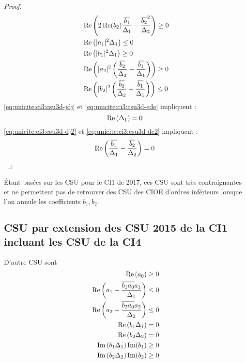 \begin{proof}
\begin{minipage}{0.49\textwidth}
\begin{align}
        \label{eq:unicite:ci3:csu3d-ere}&\Re\left(2\Re(b_2)\frac{\conj{b_1}}{\Delta_1}-\frac{\conj{b_2}^2}{\Delta_2}\right) \ge 0\\
        \label{eq:unicite:ci3:csu3d-jdj}&\Re\left(|a_1|^2\Delta_1\right) \le 0 \\
        \label{eq:unicite:ci3:csu3d-ede}&\Re\left(|b_1|^2\Delta_1\right) \ge 0 \\
        \label{eq:unicite:ci3:csu3d-dj2}&\Re\left(|a_2|^2\left(\frac{\conj{b_2}}{\Delta_2}-\frac{\conj{b_1}}{\Delta_1}\right)\right)\ge 0\\
        \label{eq:unicite:ci3:csu3d-de2}&\Re\left(|b_2|^2\left(\frac{\conj{b_2}}{\Delta_2}-\frac{\conj{b_1}}{\Delta_1}\right)\right)\le 0
      \end{align}
      \eqref{eq:unicite:ci3:csu3d-jdj} et \eqref{eq:unicite:ci3:csu3d-ede} impliquent :
      \begin{equation}
        \Re\left(\Delta_1\right) = 0\\\
      \end{equation}
      \eqref{eq:unicite:ci3:csu3d-dj2} et \eqref{eq:unicite:ci3:csu3d-de2} impliquent :
      \begin{equation}
        \Re\left(\frac{\conj{b_1}}{\Delta_1}-\frac{\conj{b_2}}{\Delta_2}\right) = 0\\\
      \end{equation}
    \end{minipage}
  \end{proof}

  Étant basées sur les CSU pour le CI1 de 2017, ces CSU sont très contraignantes et ne permettent pas de retrouver des CSU des CIOE d'ordres inférieurs lorsque l'on annule les coefficients \(b_1, b_2\). 


\subsection{CSU par extension des CSU 2015 de la CI1 incluant les CSU de la CI4}

  \begin{prop}
    D'autre CSU sont
    \begin{align}
      \Re\left(a_0\right)\ge 0 \\
      \Re\left(a_1 - \frac{\conj{b_1a_0}a_1}{\Delta_1}\right) \le 0 \\
      \Re\left(a_2 - \frac{\conj{b_2a_0}a_2}{\Delta_2}\right) \le 0 \\
      \Re\left(b_1\Delta_1\right) = 0 \\
      \Re\left(b_2\Delta_2\right) = 0 \\
      \Im\left(b_1\Delta_1\right)\Im(b_1)\ge 0\\
      \Im\left(b_2\Delta_2\right)\Im(b_2)\ge 0
    \end{align}
  \end{prop}

